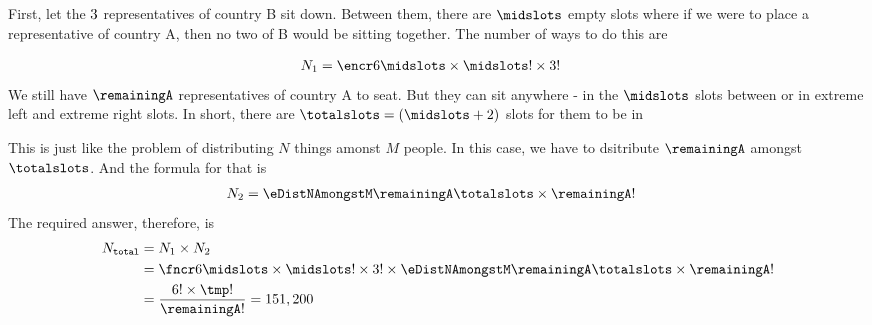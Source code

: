 
\watchout

\begin{solution}
	\begin{fullwidth}
	First, let the $3$ representatives of country B sit down. Between them, there are $\midslots$ empty 
	slots where if we were to place a representative of country A, then no two of B would be sitting 
	together. The number of ways to do this are 
	
	\begin{align}
		N_1 &= \encr\vbone\midslots\times\midslots ! \times\vbtwo !
	\end{align}
	We still have $\remainingA$ representatives of country A to seat. But they can sit anywhere - 
	in the $\midslots$ slots between or in extreme left and extreme right slots. In short, there are 
	$\totalslots = (\midslots + 2)$ slots for them to be in 
	
	This is just like the problem of distributing $N$ things amonst $M$ people. In this case, we 
	have to dsitribute $\remainingA$ amongst $\totalslots$. And the formula for that is
	\begin{align}
		N_2 &= \eDistNAmongstM\remainingA\totalslots\times\remainingA !
	\end{align}
	The required answer, therefore, is 
	\begin{align}
		N_{\texttt{total}} &= N_1 \times N_2 \\ 
		&= \fncr\vbone\midslots\times\midslots ! \times\vbtwo ! \times \eDistNAmongstM\remainingA\totalslots\times\remainingA ! \\
		&= \dfrac{\vbone ! \times \tmp !}{\remainingA !} = \vbthree
	\end{align}
	\end{fullwidth}
\end{solution}
